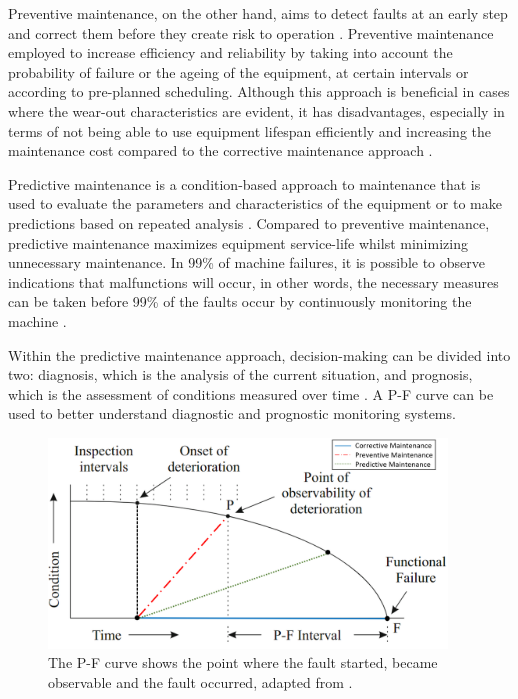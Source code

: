 Preventive maintenance, on the other hand, aims to detect faults at an early step and correct them before they create risk to operation \cite{en201713306}. Preventive maintenance employed to increase efficiency and reliability by taking into account the probability of failure or the ageing of the equipment, at certain intervals or according to pre-planned scheduling. Although this approach is beneficial in cases where the wear-out characteristics are evident, it has disadvantages, especially in terms of not being able to use equipment lifespan efficiently and increasing the maintenance cost compared to the corrective maintenance approach \cite{AHMAD}.

Predictive maintenance is a condition-based approach to maintenance that is used to evaluate the parameters and characteristics of the equipment or to make predictions based on repeated analysis \cite{en201713306}. Compared to preventive maintenance, predictive maintenance maximizes equipment service-life whilst minimizing unnecessary maintenance. In 99\% of machine failures, it is possible to observe indications that malfunctions will occur, in other words, the necessary measures can be taken before 99\% of the faults occur by continuously monitoring the machine \cite{AHMAD}.

Within the predictive maintenance approach, decision-making can be divided into two: diagnosis, which is the analysis of the current situation, and prognosis, which is the assessment of conditions measured over time \cite{tinga2019physical}. A P-F curve can be used to better understand diagnostic and prognostic monitoring systems.

\begin{figure}[h]
	\centering
	\includegraphics[width=300pt,keepaspectratio=true]{./fig/PFdiagram.png}
	\caption{The P-F curve shows the point where the fault started, became observable and the fault occurred, adapted from \cite{tinga2019physical}.}	
	\label{PF_diagram}
\end{figure}

